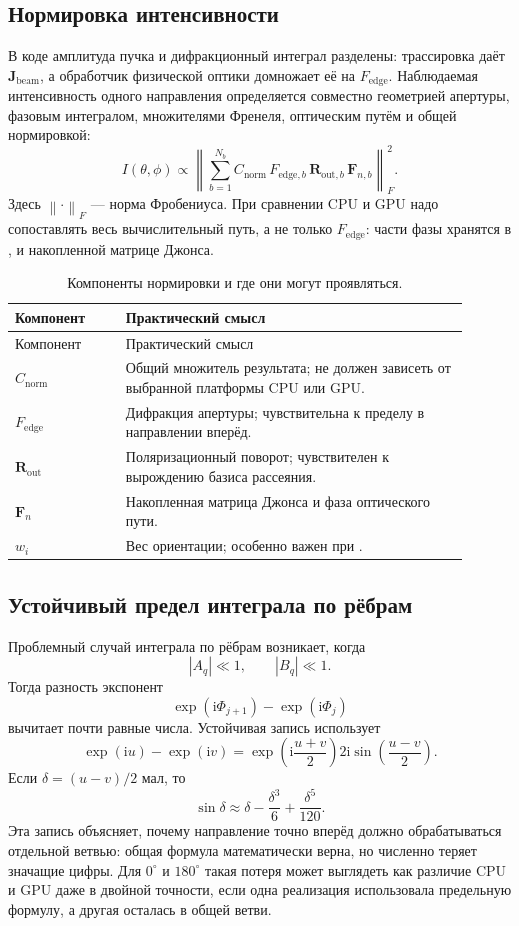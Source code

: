 \documentclass[11pt,a4paper]{article}
\newcommand{\code}[1]{\texttt{\small\detokenize{#1}}}
\newcommand{\matr}[1]{\symbf{#1}}
\newcommand{\ii}{\mathrm{i}}
\newcommand{\norm}[1]{\left\lVert #1 \right\rVert}
\begin{document}
\subsection{Нормировка интенсивности}

В коде амплитуда пучка и дифракционный интеграл разделены: трассировка даёт
$\matr J_{\mathrm{beam}}$, а обработчик физической оптики домножает её на
$F_{\mathrm{edge}}$. Наблюдаемая интенсивность одного направления определяется
совместно геометрией апертуры, фазовым интегралом, множителями Френеля,
оптическим путём и общей нормировкой:
\[
  I(\theta,\phi)
  \propto
  \left\lVert
  \sum_{b=1}^{N_b}
  C_{\mathrm{norm}}\,
  F_{\mathrm{edge},b}\,
  \matr R_{\mathrm{out},b}\,
  \matr F_{n,b}
  \right\rVert_F^2.
\]
Здесь $\norm{\cdot}_F$ --- норма Фробениуса. При сравнении CPU и GPU надо
сопоставлять весь вычислительный путь, а не только $F_{\mathrm{edge}}$: части
фазы хранятся в \code{J_phased}, \code{dirPhase} и накопленной матрице Джонса.

\begin{longtable}{L{0.22\linewidth} L{0.68\linewidth}}
\caption{Компоненты нормировки и где они могут проявляться.}\\
\toprule
Компонент & Практический смысл \\
\midrule
\endfirsthead
\toprule
Компонент & Практический смысл \\
\midrule
\endhead
$C_{\mathrm{norm}}$ & Общий множитель результата; не должен зависеть от выбранной платформы CPU или GPU. \\
$F_{\mathrm{edge}}$ & Дифракция апертуры; чувствительна к пределу в направлении вперёд. \\
$\matr R_{\mathrm{out}}$ & Поляризационный поворот; чувствителен к вырождению базиса рассеяния. \\
$\matr F_n$ & Накопленная матрица Джонса и фаза оптического пути. \\
$w_i$ & Вес ориентации; особенно важен при \code{--pole}. \\
\bottomrule
\end{longtable}

\subsection{Устойчивый предел интеграла по рёбрам}

Проблемный случай интеграла по рёбрам возникает, когда
\[
  |A_q|\ll1,\qquad |B_q|\ll1.
\]
Тогда разность экспонент
\[
  \exp(\ii\Phi_{j+1})-\exp(\ii\Phi_j)
\]
вычитает почти равные числа. Устойчивая запись использует
\[
  \exp(\ii u)-\exp(\ii v)
  =
  \exp\!\left(\ii\frac{u+v}{2}\right)
  2\ii\sin\!\left(\frac{u-v}{2}\right).
\]
Если $\delta=(u-v)/2$ мал, то
\[
  \sin\delta \approx
  \delta-\frac{\delta^3}{6}+\frac{\delta^5}{120}.
\]
Эта запись объясняет, почему направление точно вперёд должно обрабатываться
отдельной ветвью: общая формула математически верна, но численно теряет
значащие цифры. Для $0^\circ$ и $180^\circ$ такая потеря может выглядеть как
различие CPU и GPU даже в двойной точности, если одна реализация использовала
предельную формулу, а другая осталась в общей ветви.
\end{document}
